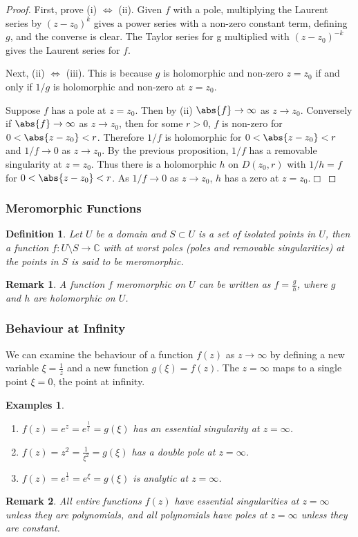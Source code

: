 \documentclass{article}
\theoremstyle{plain}\theoremheaderfont{\normalfont\itshape}\theorembodyfont{\rmfamily}\theoremseparator{.}\newtheorem*{rem}{Remark}\newtheorem*{ex}{Example}\newtheorem*{proof}{Proof}\newtheorem*{altp}{Alternative proof}
\theoremstyle{plain}\theoremheaderfont{\normalfont\bfseries}\theorembodyfont{\rmfamily}\theoremseparator{.}\newtheorem{thm}{Theorem}[section]\newtheorem{lem}[thm]{Lemma}\newtheorem{prop}[thm]{Proposition}\newtheorem*{cor}{Corollary}\newtheorem{defn}[thm]{Definition}\newtheorem{clm}[thm]{Claim}\newtheorem{clminproof}{Claim}
\theoremstyle{break}\theoremheaderfont{\normalfont\itshape}\theorembodyfont{\rmfamily}\theoremseparator{.\medskip}\newtheorem*{proofskip}{Proof}\newtheorem*{exs}{Examples}\newtheorem*{rems}{Remarks}
\theoremstyle{break}\theoremheaderfont{\normalfont\bfseries}\theorembodyfont{\rmfamily}\theoremseparator{.\medskip}\newtheorem{lemskip}[thm]{Lemma}\newtheorem{defnskip}[thm]{Definition}\newtheorem{propskip}[thm]{Proposition}\newtheorem{thmskip}[thm]{Theorem}
\numberwithin{equation}{section}
\newcommand{\qed}{\hfill\ensuremath{\Box}}
\begin{document}
	\begin{proof}
		First, prove (i) \(\Leftrightarrow\) (ii). Given \(f\) with a pole, multiplying the Laurent series by \((z-z_0)^k\) gives a power series with a non-zero constant term, defining \(g\), and the converse is clear. The Taylor series for g multiplied with \((z-z_0)^{-k}\) gives the Laurent series for \(f\).
 		
		Next, (ii) \(\Leftrightarrow\) (iii). This is because \(g\) is holomorphic and non-zero \(z=z_0\) if and only if \(1/g\) is holomorphic and non-zero at \(z=z_0\).
		
		Suppose \(f\) has a pole at \(z=z_0\). Then by (ii) \(\abs{f}\to\infty\) as \(z\to z_0\). Conversely if \(\abs{f}\to\infty\) as \(z\to z_0\), then for some \(r>0\), \(f\) is non-zero for \(0 <\abs{z-z_0}<r\). Therefore \(1/f\) is holomorphic for \(0<\abs{z-z_0}<r\) and \(1/f\to 0\) as \(z\to z_0\). By the previous proposition, \(1/f\) has a removable singularity at \(z=z_0\). Thus there is a holomorphic \(h\) on \(D(z_0,r)\) with \(1/h = f\) for \(0<\abs{z-z_0}<r\). As \(1/f\to 0\) as \(z\to z_0\), \(h\) has a zero at \(z=z_0\).\qed
	\end{proof}
	\subsubsection{Meromorphic Functions}
	\begin{defn}
		Let \(U\) be a domain and \(S\subset U\) is a set of isolated points in \(U\), then a function \(f:U\setminus S\to\mathbb{C}\) with at worst poles (poles and removable singularities) at the points in \(S\) is said to be \textit{meromorphic}.
	\end{defn}
	\begin{rem}
		A function \(f\) meromorphic on \(U\) can be written as \(f=\frac{g}{h}\),
		where \(g\) and \(h\) are holomorphic on \(U\).
	\end{rem}

	\subsubsection{Behaviour at Infinity}
	We can examine the behaviour of a function \(f(z)\) as \(z\to\infty\) by defining a new variable \(\xi=\frac{1}{z}\) and a new function \(g(\xi)=f(z)\). The \(z=\infty\) maps to a single point \(\xi=0\), the point at infinity.
	\begin{exs}
		\begin{enumerate}[topsep=0pt,label=(\roman*)]
			\item \(f(z)=e^z=e^{\frac{1}{\xi}}=g(\xi)\) has an essential singularity at \(z=\infty\).
			\item \(f(z)=z^2=\frac{1}{\xi^2}=g(\xi)\) has a double pole at \(z=\infty\).
			\item \(f(z)=e^{\frac{1}{z}}=e^\xi=g(\xi)\) is analytic at \(z=\infty\).
		\end{enumerate}
	\end{exs}
	\begin{rem}
		All entire functions \(f(z)\) have essential singularities at \(z=\infty\) unless they are polynomials, and all polynomials have poles at \(z=\infty\) unless they are constant.
	\end{rem}
\end{document}
